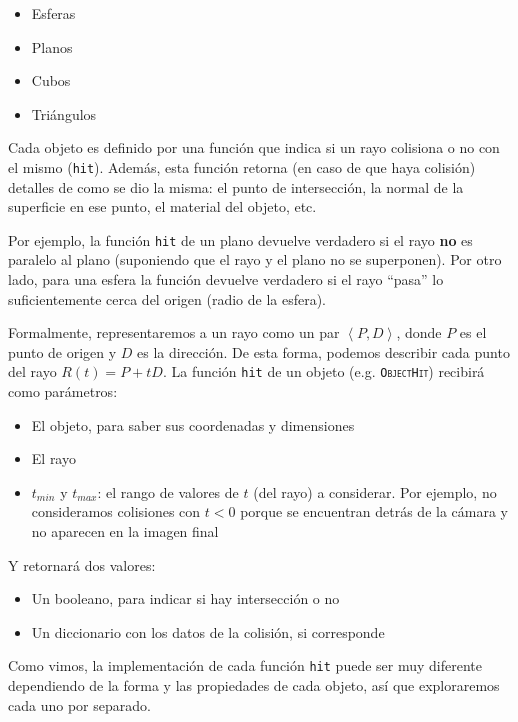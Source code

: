 \begin{itemize}
    \item Esferas
    \item Planos
    \item Cubos
    \item Triángulos
\end{itemize}

Cada objeto es definido por una función que indica si un rayo colisiona o no con
el mismo (\texttt{hit}). Además, esta función retorna (en caso de que haya
colisión) detalles de como se dio la misma: el punto de intersección, la normal
de la superficie en ese punto, el material del objeto, etc.

Por ejemplo, la función \texttt{hit} de un plano devuelve verdadero si el rayo
\textbf{no} es paralelo al plano (suponiendo que el rayo y el plano no se
superponen). Por otro lado, para una esfera la función devuelve verdadero si el
rayo ``pasa'' lo suficientemente cerca del origen (radio de la esfera).

Formalmente, representaremos a un rayo como un par
$\left\langle P, D \right\rangle$, donde $P$ es el punto de origen y $D$ es la
dirección. De esta forma, podemos describir cada punto del rayo $R(t) = P + tD$.
La función \texttt{hit} de un objeto (e.g. \textsc{\texttt{ObjectHit}}) recibirá
como parámetros:

\begin{itemize}
    \item El objeto, para saber sus coordenadas y dimensiones
    \item El rayo
    \item $t_{min}$ y $t_{max}$: el rango de valores de $t$ (del rayo) a
        considerar. Por ejemplo, no consideramos colisiones con $t < 0$ porque
        se encuentran detrás de la cámara y no aparecen en la imagen final
\end{itemize}

Y retornará dos valores:

\begin{itemize}
    \item Un booleano, para indicar si hay intersección o no
    \item Un diccionario con los datos de la colisión, si corresponde
\end{itemize}

Como vimos, la implementación de cada función \texttt{hit} puede ser muy
diferente dependiendo de la forma y las propiedades de cada objeto, así que
exploraremos cada uno por separado.

